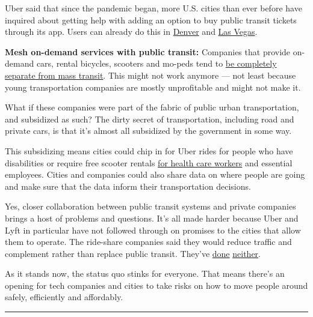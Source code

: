 Uber said that since the pandemic began, more U.S. cities than ever
before have inquired about getting help with adding an option to buy
public transit tickets through its app. Users can already do this in
\href{https://www.nytimes.com/2019/08/07/technology/uber-train-bus-public-transit.html}{Denver}
and
\href{https://www.sfchronicle.com/business/article/Uber-will-sell-bus-tickets-through-its-app-in-Las-14953445.php}{Las
Vegas}.

\textbf{Mesh on-demand services with public transit:} Companies that
provide on-demand cars, rental bicycles, scooters and mo-peds tend to
\href{https://www.nytimes.com/2019/08/07/technology/uber-train-bus-public-transit.html}{be
completely separate from mass transit}. This might not work anymore ---
not least because young transportation companies are mostly unprofitable
and might not make it.

What if these companies were part of the fabric of public urban
transportation, and subsidized as such? The dirty secret of
transportation, including road and private cars, is that it's almost all
subsidized by the government in some way.

This subsidizing means cities could chip in for Uber rides for people
who have disabilities or require free scooter rentals
\href{https://www.citylab.com/transportation/2019/10/pittsburgh-micromobility-collective-waze-spin-swiftmile-zipcar/599779/}{for
health care workers} and essential employees. Cities and companies could
also share data on where people are going and make sure that the data
inform their transportation decisions.

Yes, closer collaboration between public transit systems and private
companies brings a host of problems and questions. It's all made harder
because Uber and Lyft in particular have not followed through on
promises to the cities that allow them to operate. The ride-share
companies said they would reduce traffic and complement rather than
replace public transit. They've
\href{https://www.nytimes.com/interactive/2020/03/13/upshot/mystery-of-missing-bus-riders.html}{done}
\href{https://www.wsj.com/articles/the-ride-hail-utopia-that-got-stuck-in-traffic-11581742802}{neither}.

As it stands now, the status quo stinks for everyone. That means there's
an opening for tech companies and cities to take risks on how to move
people around safely, efficiently and affordably.

\begin{center}\rule{0.5\linewidth}{\linethickness}\end{center}

